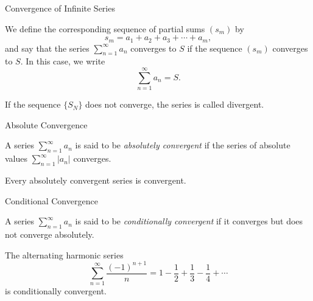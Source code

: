 \documentclass[12pt, a4paper]{article}
\begin{document}
\FrontPage
\Large


\begin{heading}
	Convergence of Infinite Series
\end{heading}

\begin{definition}
	We define the corresponding sequence of partial sums $(s_m)$ by
	\[
	s_m = a_1 + a_2 + a_3 + \cdots + a_m,
	\]
	and say that the series 
	\(
	\sum_{n=1}^{\infty} a_n
	\)
	converges to $S$ if the sequence $(s_m)$ converges to $S$.  
	In this case, we write
	\[
	\sum_{n=1}^{\infty} a_n = S.
	\]
	\vspace{5pt}
	
	If the sequence $\{S_N\}$ does not converge, the series is called divergent.
\end{definition}

\clearpage

\begin{heading}
	Absolute Convergence
\end{heading}

\vspace{10pt}

\begin{definition}
	A series $\sum_{n=1}^{\infty} a_n$ is said to be \textit{absolutely convergent} if the series of absolute values $\sum_{n=1}^{\infty} |a_n|$ converges.	
\end{definition}

\vspace{10pt}

\begin{theorem}
	Every absolutely convergent series is convergent.
\end{theorem}

\clearpage

\begin{heading}
	Conditional Convergence
\end{heading}

\vspace{10pt}

\begin{definition}
	A series $\sum_{n=1}^{\infty} a_n$ is said to be \textit{conditionally convergent} if it converges but does not converge absolutely.
\end{definition}

\clearpage

\begin{problem}
	The alternating harmonic series
	\[
	\sum_{n=1}^{\infty} \frac{(-1)^{n+1}}{n} = 1 - \frac{1}{2} + \frac{1}{3} - \frac{1}{4} + \cdots
	\]
	is conditionally convergent.
\end{problem}
\end{document}
